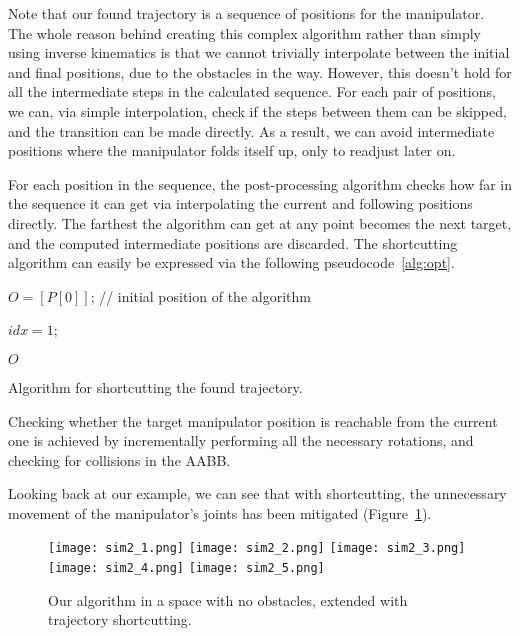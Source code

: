 Note that our found trajectory is a sequence of positions for the manipulator. The whole reason behind creating this complex algorithm rather than simply using inverse kinematics is that we cannot trivially interpolate between the initial and final positions, due to the obstacles in the way. However, this doesn't hold for all the intermediate steps in the calculated sequence. For each pair of positions, we can, via simple interpolation, check if the steps between them can be skipped, and the transition can be made directly. As a result, we can avoid intermediate positions where the manipulator folds itself up, only to readjust later on.

For each position in the sequence, the post-processing algorithm checks how far in the sequence it can get via interpolating the current and following positions directly. The farthest the algorithm can get at any point becomes the next target, and the computed intermediate positions are discarded. The shortcutting algorithm can easily be expressed via the following pseudocode~\ref{alg:opt}.

\begin{algorithm}

 $O = [P[0]]$; // initial position of the algorithm

 $idx = 1$;


\Return $O$\;

\caption{Algorithm for shortcutting the found trajectory.}\label{alg:opt}
\end{algorithm}

Checking whether the target manipulator position is reachable from the current one is achieved by incrementally performing all the necessary rotations, and checking for collisions in the AABB.

Looking back at our example, we can see that with shortcutting, the unnecessary movement of the manipulator's joints has been mitigated (Figure~\ref{fig:sim2}).

\begin{figure}[ht]
  \centering
  \begin{minipage}{\textwidth}
    \texttt{[image: sim2\_1.png]}
    \texttt{[image: sim2\_2.png]}
    \texttt{[image: sim2\_3.png]}
    \texttt{[image: sim2\_4.png]}
    \texttt{[image: sim2\_5.png]}
  \end{minipage}
  \caption{Our algorithm in a space with no obstacles, extended with trajectory shortcutting.}\label{fig:sim2}
\end{figure}

